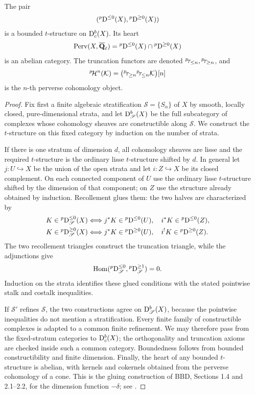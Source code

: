 \begin{theorem}
\label{thm:middle-t-structure}
The pair
\[
  ({}^p\mathrm D^{\leq0}(X),{}^p\mathrm D^{\geq0}(X))
\]
is a bounded \(t\)-structure on \(\mathrm D^b_c(X)\).  Its heart
\[
  \operatorname{Perv}(X,\overline{\mathbf Q}_\ell)
  ={}^p\mathrm D^{\leq0}(X)\cap{}^p\mathrm D^{\geq0}(X)
\]
is an abelian category.  The truncation functors are denoted
\({}^{p}\!\tau_{\leq n},{}^{p}\!\tau_{\geq n}\), and
\[
  {}^{p}\!\mathcal H^n(\mathcal K)=\bigl({}^{p}\!\tau_{\geq n}{}^{p}\!\tau_{\leq n}\mathcal K\bigr)[n]
\]
is the \(n\)-th perverse cohomology object.
\end{theorem}

\begin{proof}
Fix first a finite algebraic stratification
\(\mathscr S=\{S_\alpha\}\) of \(X\) by smooth, locally closed,
pure-dimensional strata, and let \(\mathrm D^b_{\mathscr S}(X)\) be the full
subcategory of complexes whose cohomology sheaves are constructible along
\(\mathscr S\).  We construct the \(t\)-structure on this fixed category by
induction on the number of strata.

If there is one stratum of dimension \(d\), all cohomology sheaves are lisse
and the required \(t\)-structure is the ordinary lisse \(t\)-structure shifted
by \(d\).  In general let \(j:U\hookrightarrow X\) be the union of the open
strata and let \(i:Z\hookrightarrow X\) be its closed complement.  On each
connected component of \(U\) use the ordinary lisse \(t\)-structure shifted by
the dimension of that component; on \(Z\) use the structure already obtained
by induction.  Recollement glues them: the two halves are characterized by
\[
 \begin{split}
 K\in{}^p\mathrm D_{\mathscr S}^{\leq0}(X)
 &\Longleftrightarrow
 j^*K\in{}^p\mathrm D^{\leq0}(U),\quad i^*K\in{}^p\mathrm D^{\leq0}(Z),\\
 K\in{}^p\mathrm D_{\mathscr S}^{\geq0}(X)
 &\Longleftrightarrow
 j^*K\in{}^p\mathrm D^{\geq0}(U),\quad i^!K\in{}^p\mathrm D^{\geq0}(Z).
 \end{split}
\]
The two recollement triangles construct the truncation triangle, while the
adjunctions give
\[
 \operatorname{Hom}({}^p\mathrm D^{\leq0}_{\mathscr S},
      {}^p\mathrm D^{\geq1}_{\mathscr S})=0.
\]
Induction on the strata identifies these glued conditions with the stated
pointwise stalk and costalk inequalities.

If \(\mathscr S'\) refines \(\mathscr S\), the two constructions agree on
\(\mathrm D^b_{\mathscr S}(X)\), because the pointwise inequalities do not mention a
stratification.  Every finite family of constructible complexes is adapted to
a common finite refinement.  We may therefore pass from the fixed-stratum
categories to \(\mathrm D^b_c(X)\); the orthogonality and truncation axioms are checked
inside such a common category.  Boundedness follows from bounded
constructibility and finite dimension.  Finally, the heart of any bounded
\(t\)-structure is abelian, with kernels and cokernels obtained from the
perverse cohomology of a cone.  This is the gluing construction of
BBD, Sections 1.4 and 2.1--2.2, for the dimension function \(-\delta\);
see \cite{BBD}.
\end{proof}

